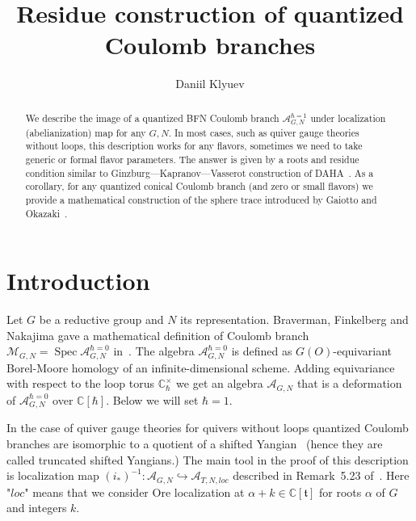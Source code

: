 \documentclass{article}
\renewcommand{\C}{\mathbb{C}}
\newcommand{\Spec}{\operatorname{Spec}}
\newcommand{\mf}{\mathfrak}
\newcommand{\mc}[1]{\mathcal{#1}}
\begin{document}
\newtheorem{thr}{Theorem}[section]
\newtheorem*{thr*}{Theorem}
\newtheorem{lem}[thr]{Lemma}
\newtheorem*{lem*}{Lemma}
\newtheorem{cor}[thr]{Corollary}
\newtheorem{prop}[thr]{Proposition}
\newtheorem*{prop*}{Proposition}
\newtheorem{stat}[thr]{Statement}
\newtheorem*{stat*}{Statement}
\newtheorem{example}[thr]{Example}

\theoremstyle{definition}
\newtheorem{defn}[thr]{Definition}
\newtheorem*{defn*}{Definition}
\theoremstyle{remark}
\newtheorem{rem}[thr]{Remark}
\newtheorem*{rem*}{Remark}
\title{Residue construction of quantized Coulomb branches}
\author{Daniil Klyuev}

\maketitle
\begin{abstract}
We describe the image of a quantized BFN Coulomb branch $\mc{A}_{G,N}^{\hbar=1}$ under localization (abelianization) map for any $G,N$. In most cases, such as quiver gauge theories without loops, this description works for any flavors, sometimes we need to take generic or formal flavor parameters. The answer is given by a roots and residue condition similar to Ginzburg---Kapranov---Vasserot construction of DAHA~\cite{GKV}. As a corollary, for any quantized conical Coulomb branch (and zero or small flavors) we provide a mathematical construction of the sphere trace introduced by Gaiotto and Okazaki~\cite{GO}.
\end{abstract}
\section{Introduction}

Let $G$ be a reductive group and $N$ its representation. Braverman, Finkelberg and Nakajima gave a mathematical definition of Coulomb branch $\mc{M}_{G,N}=\Spec \mc{A}_{G,N}^{\hbar=0}$ in~\cite{BFN}. The algebra $\mc{A}_{G,N}^{\hbar=0}$ is defined as $G(O)$-equivariant Borel-Moore homology of an infinite-dimensional scheme. Adding equivariance with respect to the loop torus $\C^{\times}_{\hbar}$ we get an algebra $\mc{A}_{G,N}$ that is a deformation of $\mc{A}_{G,N}^{\hbar=0}$ over $\C[\hbar]$. Below we will set $\hbar=1$. 

In the case of quiver gauge theories for quivers without loops quantized Coulomb branches are isomorphic to a quotient of a shifted Yangian~\cite{BFNQuivers, KTWWY} (hence they are called truncated shifted Yangians.) The main tool in the proof of this description is localization map $(i_*)^{-1}\colon \mc{A}_{G,N}\hookrightarrow \mc{A}_{T,N,loc}$ described in Remark~5.23 of~\cite{BFN}.  Here "$loc$" means that we consider Ore localization at $\alpha+k\in\C[\mf{t}]$ for roots $\alpha$ of $G$ and integers $k$.
\end{document}
